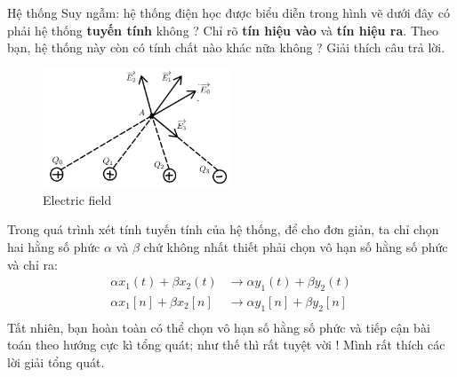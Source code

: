 \documentclass[8pt]{beamer}
\begin{document}
\begin{frame}{Hệ thống}
	Suy ngẫm: hệ thống điện học được biểu diễn trong hình vẽ dưới đây có phải hệ thống \textbf{tuyến tính} không ? Chỉ rõ \textbf{tín hiệu vào} và \textbf{tín hiệu ra}. Theo bạn, hệ thống này còn có tính chất nào khác nữa không ? Giải thích câu trả lời.

\begin{figure}[h]
			\includegraphics[width=0.5\textwidth]{e.jpg}
			\caption{Electric field}	\label{fig:re19}
		\end{figure}
Trong quá trình xét tính tuyến tính của hệ thống, để cho đơn giản, ta chỉ chọn hai hằng số phức $\alpha$ và $\beta$ chứ không nhất thiết phải chọn vô hạn số hằng số phức và chỉ ra:
\begin{equation*}
	\begin{split}
		\alpha x_{1}(t)+\beta x_{2}(t)&\to \alpha y_{1}(t)+\beta y_{2}(t) \\
		\alpha x_{1}[n]+\beta x_{2}[n]&\to \alpha y_{1}[n]+\beta y_{2}[n] \\
	\end{split}
\end{equation*}
Tất nhiên, bạn hoàn toàn có thể chọn vô hạn số hằng số phức và tiếp cận bài toán theo hướng cực kì tổng quát; như thế thì rất tuyệt vời ! Mình rất thích các lời giải tổng quát.
\end{frame}
\end{document}
